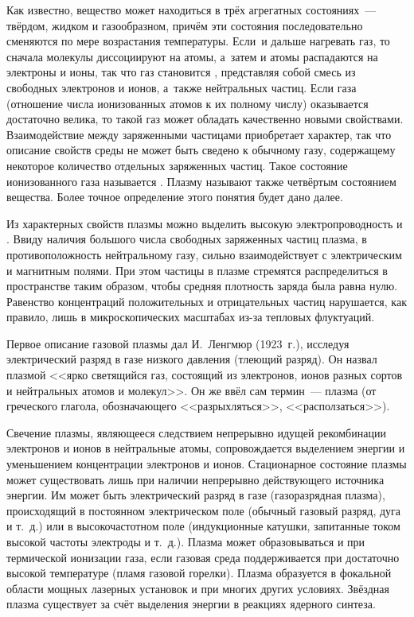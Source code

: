 
Как известно, вещество может находиться в трёх агрегатных состояниях~--- твёрдом,
жидком и газообразном, причём эти
состояния последовательно сменяются по мере возрастания температуры. Если~и
дальше нагревать газ, то сначала молекулы диссоциируют на атомы, а~затем и атомы
распадаются на электроны и ионы, так что газ становится ,
представляя собой смесь из свободных электронов и ионов, а~также нейтральных
частиц. Если  газа
(отношение числа ионизованных атомов к их полному числу) оказывается достаточно велика, то
такой газ может обладать качественно новыми свойствами.
Взаимодействие между заряженными частицами приобретает  характер,
так что описание свойств среды не может быть сведено к обычному газу,
содержащему некоторое количество отдельных заряженных частиц.
Такое состояние ионизованного газа называется .
Плазму называют также четвёртым состоянием вещества.
Более точное определение этого понятия будет дано далее.

Из характерных свойств плазмы можно выделить высокую электропроводность и
. Ввиду наличия большого числа свободных
заряженных частиц плазма, в противоположность нейтральному газу, сильно
взаимодействует с электрическим и магнитным полями.
При этом частицы в плазме стремятся распределиться в пространстве таким образом,
чтобы средняя плотность заряда была равна нулю. Равенство концентраций
положительных и отрицательных частиц нарушается, как правило,
лишь в микроскопических масштабах из-за тепловых флуктуаций.

Первое описание газовой плазмы дал И.~Ленгмюр (1923~г.), исследуя электрический
разряд в газе низкого давления (тлеющий разряд). Он назвал плазмой <<ярко
светящийся газ, состоящий из электронов, ионов разных сортов и нейтральных
атомов и молекул>>. Он же ввёл сам термин~--- плазма (от греческого глагола,
обозначающего <<разрыхляться>>, <<расползаться>>).

Свечение плазмы, являющееся следствием непрерывно идущей
рекомбинации электронов и ионов в нейтральные атомы, сопровождается выделением
энергии и уменьшением концентрации электронов и ионов. Стационарное состояние
плазмы может существовать лишь при наличии непрерывно действующего источника
энергии. Им может быть электрический разряд в газе (газоразрядная плазма),
происходящий в постоянном электрическом поле (обычный газовый разряд,
дуга и т.~д.) или в высокочастотном поле (индукционные катушки,
запитанные током высокой частоты электроды и т.~д.).
Плазма может образовываться и при термической ионизации газа, если газовая среда
поддерживается при достаточно высокой температуре (пламя газовой
горелки). Плазма образуется в фокальной области мощных лазерных установок и при
многих других условиях. Звёздная плазма существует за счёт выделения энергии
в реакциях ядерного синтеза.

